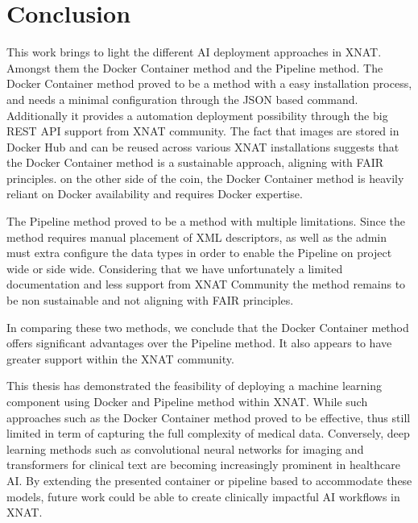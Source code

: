 \chapter{Conclusion}


This work brings to light the different AI deployment approaches in XNAT. Amongst them the Docker Container method and the Pipeline method. 
The Docker Container method proved to be a method with a easy installation process, and needs a minimal configuration through the JSON based command. Additionally it provides a automation deployment possibility through the big REST API support from XNAT community. The fact that images are stored in Docker Hub and can be reused across various XNAT installations suggests that the Docker Container method is a sustainable approach, aligning with FAIR principles.
on the other side of the coin, the Docker Container method is heavily reliant on Docker availability and requires Docker expertise.

The Pipeline method proved to be a method with multiple limitations. Since the method requires manual placement of XML descriptors, as well as the admin must extra configure the data types in order to enable the Pipeline on project wide or side wide. Considering that we have unfortunately a limited documentation and less support from XNAT Community the method remains to be non sustainable and not aligning with FAIR principles.

In comparing these two methods, we conclude that the Docker Container method offers significant advantages over the Pipeline method. It also appears to have greater support within the XNAT community.

This thesis has demonstrated the feasibility of deploying a machine learning component using Docker and Pipeline method within XNAT. 
While such approaches such as the Docker Container method proved to be effective, thus still limited in term of capturing the full complexity of medical data.
Conversely, deep learning methods such as convolutional neural networks for imaging and transformers for clinical text are becoming increasingly prominent in healthcare AI.
By extending the presented container or pipeline based to accommodate these models, future work could be able to create clinically impactful AI workflows in XNAT.





